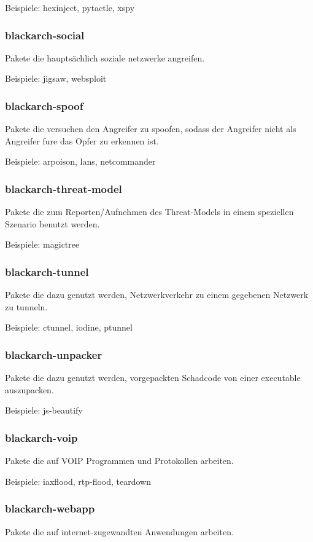 \documentclass[a4paper, oneside, 11pt]{book}
\begin{document}
Beispiele: hexinject, pytactle, xspy

\subsubsection{blackarch-social}
Pakete die hauptsächlich soziale netzwerke angreifen.

Beispiele: jigsaw, websploit

\subsubsection{blackarch-spoof}
Pakete die versuchen den Angreifer zu spoofen, 
sodass der Angreifer nicht als Angreifer fure das Opfer zu 
erkennen ist.

Beispiele: arpoison, lans, netcommander

\subsubsection{blackarch-threat-model}
Pakete die zum Reporten/Aufnehmen des Threat-Models
in einem speziellen Szenario benutzt werden.

Beispiele: magictree

\subsubsection{blackarch-tunnel}
Pakete die dazu genutzt werden, Netzwerkverkehr zu einem
gegebenen Netzwerk zu tunneln.

Beispiele: ctunnel, iodine, ptunnel

\subsubsection{blackarch-unpacker}
Pakete die dazu genutzt werden, vorgepackten Schadcode von 
einer executable auszupacken.

Beispiele: js-beautify

\subsubsection{blackarch-voip}
Pakete die auf VOIP Programmen und Protokollen arbeiten.

Beispiele: iaxflood, rtp-flood, teardown

\subsubsection{blackarch-webapp}
Pakete die auf internet-zugewandten Anwendungen arbeiten.
\end{document}
